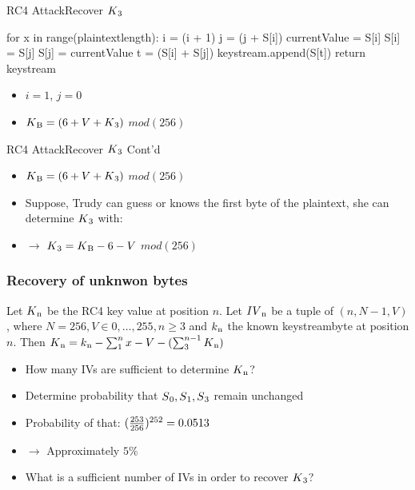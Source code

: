 \documentclass[
	aspectratio=169,	%
	onlytextwidth,		%
	t,					%
	]{beamer}
\begin{document}
\begin{frame}[fragile]{RC4 Attack}{Recover $K\textsubscript{3}$}

	\begin{python}
		for x in range(plaintextlength):
			i = (i + 1) %
			j = (j + S[i]) %
			currentValue = S[i]
			S[i] = S[j]
			S[j] = currentValue
			t = (S[i] + S[j]) %
			keystream.append(S[t])
		return keystream
	\end{python}

	\begin{itemize}
		\item $i = 1$, $j = 0$
		\item $K\textsubscript{B} = (6 + V + K\textsubscript{3})$ $mod(256)$
	\end{itemize}

\end{frame}

\begin{frame}[fragile]{RC4 Attack}{Recover $K\textsubscript{3}$ Cont'd}

	\begin{itemize}
		\item $K\textsubscript{B} = (6 + V + K\textsubscript{3})$ $mod(256)$
		\item Suppose, Trudy can guess or knows the first byte of the plaintext, she can determine $K\textsubscript{3}$ with:
		\item $\rightarrow$ $K\textsubscript{3}  = K\textsubscript{B} - 6 - V$ $mod(256)$
	\end{itemize}
\end{frame}

\begin{frame} 
	\frametitle{Recovery of unknwon bytes} 
	\begin{theorem}
		Let $ K\textsubscript{n} $ be the RC4 key value at position $ n $. Let $ IV\textsubscript{n} $ be a tuple of $ (n, N-1, V) $,
		where $ N = 256, V \in {{0,\dots,255}}, n \geq 3 $ and $ k\textsubscript{n} $ the known keystreambyte at position $n$.
		Then $ K\textsubscript{n} = k\textsubscript{n} - \sum_{1}^{n}x - V - (\sum_{3}^{n-1}K\textsubscript{n}) $ 
	\end{theorem} 
	\begin{itemize}
		\item How many IVs are sufficient to determine $ K\textsubscript{n} $?
		\item Determine probability that $ S\textsubscript{0}, S\textsubscript{1}, S\textsubscript{3} $ remain unchanged
		\item Probability of that: $(\frac{253}{256})\textsuperscript{252} = 0.0513$
		\item $\rightarrow$ Approximately $5\%$
		\item What is a sufficient number of IVs in order to recover $K\textsubscript{3}$?
	\end{itemize}
\end{frame}
\end{document}
